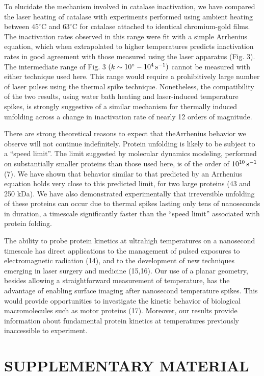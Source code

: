 \documentclass{biophys}
\begin{document}
To elucidate the mechanism involved in catalase inactivation, we have compared the laser heating of catalase with experiments performed using ambient heating between $45^\circ$C and $63^\circ$C for catalase attached to identical chromium-gold films. The inactivation rates observed in this range were fit with a simple Arrhenius equation, which when extrapolated to higher temperatures predicts inactivation rates in good agreement with those measured using the laser apparatus (Fig. 3). The intermediate range of Fig. 3 $(k \sim 10^\circ - 10^4\, {\rm s}^{-1})$ cannot be measured with either technique used here. This range would require a prohibitively large number of laser pulses using the thermal spike technique. Nonetheless, the compatibility of the two results, using water bath heating and laser-induced temperature spikes, is strongly suggestive of a similar mechanism for thermally induced unfolding across a change in inactivation rate of nearly 12 orders of magnitude.

There are strong theoretical reasons to expect that the\break Arrhenius behavior we observe will not continue indefinitely. Protein unfolding is likely to be subject to a ``speed limit''. The limit suggested by molecular dynamics modeling, performed on substantially smaller proteins than those used here, is of the order of $10^{10}\,{\rm s}^{-1}$ (7). We have shown that behavior similar to that predicted by an Arrhenius equation holds very close to this predicted limit, for two large proteins (43 and 250 kDa). We have also demonstrated experimentally that irreversible unfolding of these proteins can occur due to thermal spikes lasting only tens of nanoseconds in duration, a timescale significantly faster than the ``speed limit'' associated with protein folding.

The ability to probe protein kinetics at ultrahigh temperatures on a nanosecond timescale has direct applications to the management of pulsed exposures to electromagnetic radiation (14), and to the development of new techniques emerging in laser surgery and medicine (15,16). Our use of a planar geometry, besides allowing a straightforward measurement of temperature, has the advantage of enabling surface imaging after nanosecond temperature spikes. This would provide opportunities to investigate the kinetic behavior of biological macromolecules such as motor proteins (17). Moreover, our results provide information about fundamental protein kinetics at temperatures previously inaccessible to experiment.

\section*{SUPPLEMENTARY MATERIAL}
\end{document}
